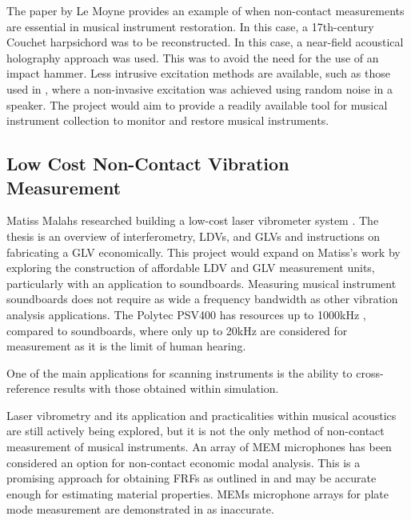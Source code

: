 
The paper by Le Moyne \cite{MOYNE} provides an example of when non-contact
measurements are essential in musical instrument restoration. In this case, a 17th-century Couchet harpsichord was to be reconstructed.  In this case, a near-field acoustical holography approach was used. This was to avoid the need for the use of an impact hammer. Less intrusive excitation methods are available, such as those used in \cite{HENNA}, where a non-invasive excitation was achieved using random noise in a speaker. The project would aim to provide a readily available tool for musical instrument collection to monitor and restore musical instruments.


\subsection{Low Cost Non-Contact Vibration Measurement}

Matiss Malahs researched building a low-cost laser vibrometer system \cite{MALAHS2015DESIGNOA}. The thesis is an overview of interferometry, LDVs, and GLVs and instructions on fabricating a GLV economically. This project would expand on Matiss's work by exploring the construction of affordable LDV and GLV measurement units, particularly with an application to soundboards. Measuring musical instrument soundboards does not require as wide a frequency bandwidth as other vibration analysis applications. The Polytec PSV400  has resources up to 1000kHz \cite{PSV400}, compared to soundboards, where only up to 20kHz are considered for measurement as it is the limit of human hearing.

One of the main applications for scanning instruments is the ability to
cross-reference results with those obtained within simulation. 

Laser vibrometry and its application and practicalities within musical acoustics are still actively being explored, but it is not the only method of non-contact measurement of musical instruments. An array of MEM microphones has been considered an option for non-contact economic modal analysis. This is a promising approach for obtaining FRFs as outlined in \cite{FARSHIDI2010755} and may be accurate enough for estimating material properties. MEMs microphone arrays for plate mode measurement are demonstrated in \cite{VELSEN} as inaccurate.

